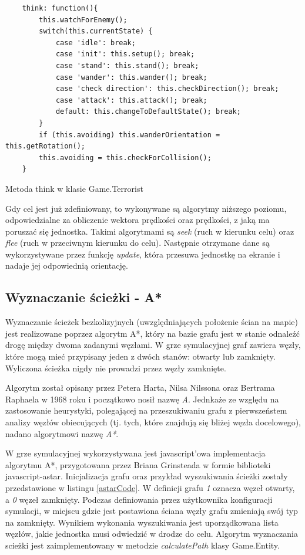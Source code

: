 \begin{table}
\begin{center}
\begin{lstlisting}
    think: function(){
        this.watchForEnemy();
        switch(this.currentState) {
            case 'idle': break;
            case 'init': this.setup(); break;
            case 'stand': this.stand(); break;
            case 'wander': this.wander(); break;
            case 'check direction': this.checkDirection(); break;
            case 'attack': this.attack(); break;
            default: this.changeToDefaultState(); break;
        }
        if (this.avoiding) this.wanderOrientation = this.getRotation();
        this.avoiding = this.checkForCollision();
    }
 \end{lstlisting}
\caption {Metoda think w klasie Game.Terrorist}
\label{thinkTer}
\end{center}
\end{table}

Gdy cel jest już zdefiniowany, to wykonywane są algorytmy niższego poziomu, odpowiedzialne za obliczenie wektora prędkości oraz prędkości, z jaką ma poruszać się jednostka. Takimi algorytmami są \emph{seek} (ruch w kierunku celu) oraz \emph{flee} (ruch w przeciwnym kierunku do celu). Następnie otrzymane dane są wykorzystywane przez funkcję \emph{update}, która przesuwa jednostkę na ekranie i nadaje jej odpowiednią orientację.

\subsection{Wyznaczanie ścieżki - A*}
Wyznaczanie ścieżek bezkolizyjnych (uwzględniających położenie ścian na mapie) jest realizowane poprzez algorytm A*, który na bazie grafu jest w stanie odnaleźć drogę między dwoma zadanymi węzłami. W grze symulacyjnej graf zawiera węzły, które mogą mieć przypisany jeden z dwóch stanów: otwarty lub zamknięty. Wyliczona ścieżka nigdy nie prowadzi przez węzły zamknięte.

Algorytm został opisany przez Petera Harta, Nilsa Nilssona oraz Bertrama Raphaela w 1968 roku i początkowo nosił nazwę \emph{A}. Jednkaże ze względu na zastosowanie heurystyki, polegającej na przeszukiwaniu grafu z pierwszeństem analizy węzłów obiecujących (tj. tych, które znajdują się bliżej węzła docelowego), nadano algorytmowi nazwę \emph{A*}.

W grze symulacyjnej wykorzystywana jest javascript'owa implementacja algorytmu A*, przygotowana przez Briana Grinsteada w formie biblioteki javascript-astar\cite{astarPage}. Inicjalizacja grafu oraz przykład wyszukiwania ścieżki zostały przedstawione w listingu \ref{astarCode}. W definicji grafu \emph{1} oznacza węzeł otwarty, a \emph{0} węzeł zamknięty. Podczas definiowania przez użytkownika konfiguracji symulacji, w miejscu gdzie jest postawiona ściana węzły grafu zmieniają swój typ na zamknięty. Wynikiem wykonania wyszukiwania jest uporządkowana lista węzłów, jakie jednostka musi odwiedzić w drodze do celu. Algorytm wyznaczania scieżki jest zaimplementowany w metodzie \emph{calculatePath} klasy Game.Entity.

